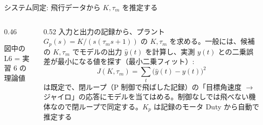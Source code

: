 
\begin{frame}{システム同定: 飛行データから $K,\tau_m$ を推定する}
  \begin{columns}[c]
    \begin{column}{0.46\textwidth}
      \centering
      {\tiny 図中の L6 = 実習 6 の理論値\par}
    \end{column}
    \begin{column}{0.52\textwidth}
      \footnotesize
      \setlength{\abovedisplayskip}{3pt}\setlength{\belowdisplayskip}{3pt}%
      入力と出力の記録から、プラント $G_p(s)=K/(s(\tau_m s+1))$ の $K,\tau_m$ を求める。一般には、候補の $K,\tau_m$ でモデルの出力 $\hat y(t)$ を計算し、実測 $y(t)$ との二乗誤差が最小になる値を探す（最小二乗フィット）:
      \[
        J(K,\tau_m)=\sum_t\bigl(\hat y(t)-y(t)\bigr)^2
      \]
       は既定で、閉ループ（P 制御で飛ばした記録）の「目標角速度 $\to$ ジャイロ」の応答にモデルを当てはめる。制御なしでは飛べない機体なので閉ループで同定する。$K_p$ は記録のモータ Duty から自動で推定する
    \end{column}
  \end{columns}
\end{frame}

